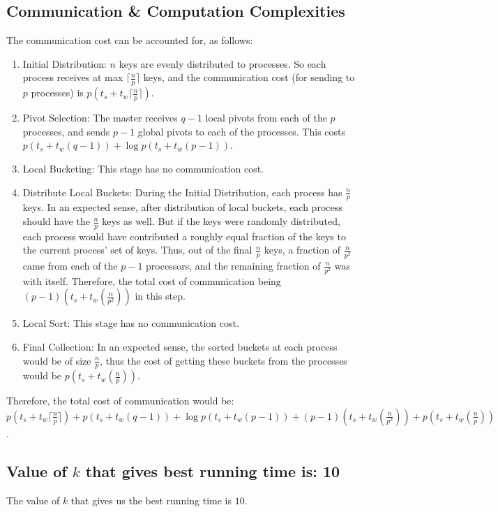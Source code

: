 \documentclass{article}
\begin{document}
\subsection{Communication \& Computation Complexities}
The communication cost can be accounted for, as follows:
\begin{enumerate}
\item Initial Distribution: $n$ keys are evenly distributed to processes. So each process
receives at max $\lceil\frac{n}{p}\rceil$ keys, and the communication cost (for sending to $p$ processes) is
$p(t_s + t_w\lceil\frac{n}{p}\rceil)$.
\item Pivot Selection: The master receives $q-1$ local pivots from each of the $p$ processes, 
and sends $p-1$ global pivots to each of the processes. This costs $p(t_s + t_w(q-1)) + 
\log{p}(t_s + t_w(p-1))$.
\item Local Bucketing: This stage has no communication cost.
\item Distribute Local Buckets: During the Initial Distribution, each process has $\frac{n}{p}$
keys. In an expected sense, after distribution of local buckets, each process should have 
the $\frac{n}{p}$ keys as well. But if the keys were randomly distributed, each process would have
contributed a roughly equal fraction of the keys to the current process' set of keys. Thus, out of
the final $\frac{n}{p}$ keys, a fraction of $\frac{n}{p^2}$ came from each of the $p-1$ processors,
and the remaining fraction of $\frac{n}{p^2}$ was with itself. Therefore, the total cost of 
communication being $(p-1)(t_s + t_w(\frac{n}{p^2}))$ in this step.
\item Local Sort: This stage has no communication cost.
\item Final Collection: In an expected sense, the sorted buckets at each process would be of size
$\frac{n}{p}$, thus the cost of getting these buckets from the processes would be
$p(t_s + t_w(\frac{n}{p}))$.
\end{enumerate}
Therefore, the total cost of communication would be: $p(t_s + t_w\lceil\frac{n}{p}\rceil) + p(t_s + t_w(q-1)) + 
\log{p}(t_s + t_w(p-1)) + (p-1)(t_s + t_w(\frac{n}{p^2})) + p(t_s + t_w(\frac{n}{p}))$.

\subsection{Value of $k$ that gives best running time is: 10}

The value of $k$ that gives us the best running time is $10$.
\end{document}
